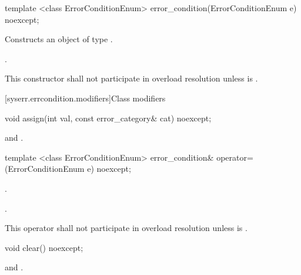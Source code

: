 %
\begin{itemdecl}
template <class ErrorConditionEnum>
  error_condition(ErrorConditionEnum e) noexcept;
\end{itemdecl}

\begin{itemdescr}
\pnum
\effects Constructs an object of type .

\pnum
\postconditions {}.

\pnum
\remarks This constructor shall not participate in overload resolution unless\linebreak
{} is .
\end{itemdescr}


[syserr.errcondition.modifiers]{Class  modifiers}

%
\begin{itemdecl}
void assign(int val, const error_category& cat) noexcept;
\end{itemdecl}

\begin{itemdescr}
\pnum
\postconditions {} and .
\end{itemdescr}

%
\begin{itemdecl}
template <class ErrorConditionEnum>
    error_condition& operator=(ErrorConditionEnum e) noexcept;
\end{itemdecl}

\begin{itemdescr}
\pnum
\postconditions {}.

\pnum
\returns {}.

\pnum
\remarks This operator shall not participate in overload resolution unless\linebreak
{} is .
\end{itemdescr}

%
\begin{itemdecl}
void clear() noexcept;
\end{itemdecl}

\begin{itemdescr}
\postconditions {} and .
\end{itemdescr}

